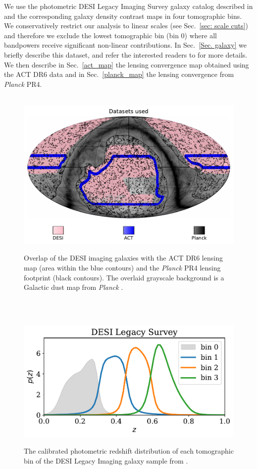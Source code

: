 \documentclass[twocolumn]{aastex631}
\begin{document}
We use the photometric DESI Legacy Imaging Survey galaxy catalog described in \cite{hang2021} and the corresponding galaxy density contrast maps in four tomographic bins. 
We conservatively restrict our analysis to linear scales (see Sec.~\ref{sec: scale cuts}) and therefore we exclude the lowest tomographic bin (bin 0) where all bandpowers receive significant non-linear contributions.
In Sec.~\ref{Sec. galaxy} we briefly describe this dataset, and refer the interested readers to \cite{hang2021} for more details. We then describe in Sec.~\ref{act_map} the lensing convergence map obtained using the ACT DR6 data and in Sec.~\ref{planck_map} the lensing convergence from \textit{Planck} PR4.

\begin{figure}
 \centering
  \includegraphics[width=0.8\linewidth]{figures/footprint.pdf}
 \caption{Overlap of the DESI imaging galaxies with the ACT DR6 lensing map (area within the blue contours) and the \textit{Planck} PR4 lensing footprint (black contours). The overlaid grayscale background is a Galactic dust map from \textit{Planck} \citep{1502.01588}.} \label{Fig.footprint}
  \end{figure}


   \begin{figure}
 \centering
  \includegraphics[width=\linewidth]{figures/nz_bin0_grey.pdf}
 \caption{ The calibrated photometric redshift distribution of each tomographic bin of the DESI Legacy Imaging galaxy sample from \cite{hang2021}.} \label{Fig.dndz}
  \end{figure}
\end{document}
